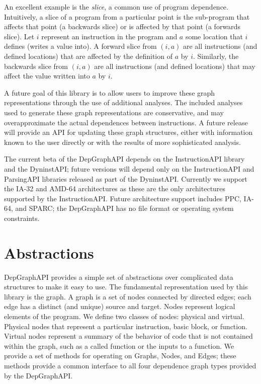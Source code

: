 \documentclass[12pt,titlepage]{article}
\begin{document}
An excellent example is the \emph{slice}, a common use of program
dependence. Intuitively, a slice of a program from a particular point
is the sub-program that affects that point (a backwards slice) or is
affected by that point (a forwards slice). Let $i$ represent an
instruction in the program and $a$ some location that $i$ defines
(writes a value into). A forward slice from $(i,a)$ are all
instructions (and defined locations) that are affected by the
definition of $a$ by $i$. Similarly, the backwards slice from $(i,a)$
are all instructions (and defined locations) that may affect the value
written into $a$ by $i$.

A future goal of this library is to allow users to improve these graph
representations through the use of additional analyses. The included
analyses used to generate these graph representations are
conservative, and may overapproximate the actual dependences between
instructions. A future release will provide an API for updating these
graph structures, either with information known to the user directly
or with the results of more sophisticated analysis.

The current beta of the DepGraphAPI depends on the InstructionAPI library
and the DyninstAPI; future versions will depend only on the
InstructionAPI and ParsingAPI libraries released as part of the
DyninstAPI. Currently we support the IA-32 and AMD-64 architectures as
these are the only architectures supported by the
InstructionAPI. Future architecture support includes PPC, IA-64, and
SPARC; the DepGraphAPI has no file format or operating system
constraints.

\section{Abstractions}

DepGraphAPI provides a simple set of abstractions over complicated
data structures to make it easy to use. The fundamental representation
used by this library is the graph. A graph is a set of nodes connected
by directed edges; each edge has a distinct (and unique) source and
target. Nodes represent logical elements of the program. We define two
classes of nodes: physical and virtual. Physical nodes that represent
a particular instruction, basic block, or function. Virtual nodes
represent a summary of the behavior of code that is not contained
within the graph, such as a called function or the inputs to a
function. We provide a set of methods for operating on Graphs, Nodes,
and Edges; these methods provide a common interface to all four
dependence graph types provided by the DepGraphAPI.
\end{document}
